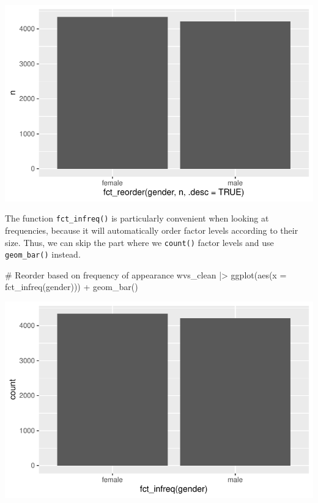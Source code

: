 \documentclass[
  letterpaper,
]{krantz}
\makeatletter
\newenvironment{Shaded}{\begin{snugshade}}{\end{snugshade}}
\newcommand{\AttributeTok}[1]{\textcolor[rgb]{0.40,0.45,0.13}{#1}}
\newcommand{\CommentTok}[1]{\textcolor[rgb]{0.37,0.37,0.37}{#1}}
\newcommand{\FunctionTok}[1]{\textcolor[rgb]{0.28,0.35,0.67}{#1}}
\newcommand{\NormalTok}[1]{\textcolor[rgb]{0.00,0.23,0.31}{#1}}
\newcommand{\SpecialCharTok}[1]{\textcolor[rgb]{0.37,0.37,0.37}{#1}}
\newenvironment{kframe}{%
\medskip{}
\setlength{\fboxsep}{.8em}
 \def\at@end@of@kframe{}%
 \ifinner\ifhmode%
  \def\at@end@of@kframe{\end{minipage}}%
  \begin{minipage}{\columnwidth}%
 \fi\fi%
 \def\FrameCommand##1{\hskip\@totalleftmargin \hskip-\fboxsep
 \colorbox{shadecolor}{##1}\hskip-\fboxsep
     \hskip-\linewidth \hskip-\@totalleftmargin \hskip\columnwidth}%
 \MakeFramed {\advance\hsize-\width
   \@totalleftmargin\z@ \linewidth\hsize
   \@setminipage}}%
 {\par\unskip\endMakeFramed%
 \at@end@of@kframe}
\renewenvironment{Shaded}{\begin{kframe}}{\end{kframe}}
\makeatother
\begin{document}
\includegraphics{07_data_wrangling_files/figure-pdf/reorder-by-other-variable-1.pdf}

The function \texttt{fct\_infreq()} is particularly convenient when
looking at frequencies, because it will automatically order factor
levels according to their size. Thus, we can skip the part where we
\texttt{count()} factor levels and use \texttt{geom\_bar()} instead.

\begin{Shaded}
\begin{Highlighting}[]
\CommentTok{\# Reorder based on frequency of appearance}
\NormalTok{wvs\_clean }\SpecialCharTok{|\textgreater{}}
  \FunctionTok{ggplot}\NormalTok{(}\FunctionTok{aes}\NormalTok{(}\AttributeTok{x =} \FunctionTok{fct\_infreq}\NormalTok{(gender))) }\SpecialCharTok{+}
  \FunctionTok{geom\_bar}\NormalTok{()}
\end{Highlighting}
\end{Shaded}

\includegraphics{07_data_wrangling_files/figure-pdf/reorder-by-other-variable-infreq-1.pdf}
\end{document}
